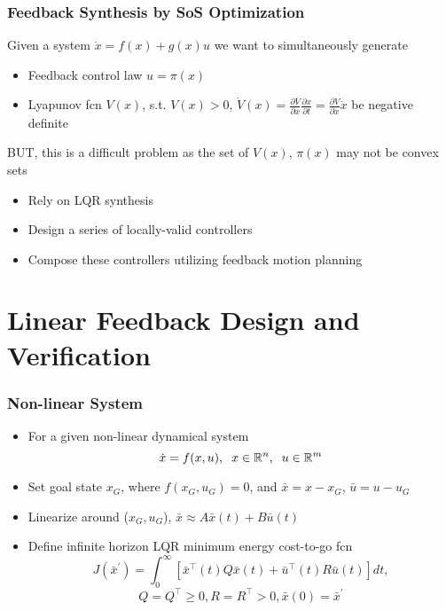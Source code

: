 \documentclass{beamer}
\begin{document}

\begin{frame}
\frametitle{Feedback Synthesis by SoS Optimization}
Given a system $\dot{x} = f(x) + g(x)u$ we want to simultaneously generate
\begin{itemize}
\item Feedback control law $u=\pi (x)$
\item Lyapunov fcn $V(x)$, s.t.  $V(x)>0$, $\dot{V}(x)=\frac{\partial V}{\partial x}\frac{\partial x}{\partial t}=\frac{\partial V}{\partial x}\dot{x}$ be negative definite \vspace{.2cm}
\end{itemize}
BUT, this is a difficult problem as the set of $V(x)$, $\pi(x)$ may not be convex sets
\begin{itemize}
\item Rely on LQR synthesis \vspace{.2cm}
\item Design a series of locally-valid controllers \vspace{.2cm}
\item Compose these controllers utilizing feedback motion planning
\end{itemize}
\end{frame}

\section{Linear Feedback Design and Verification}

\begin{frame}
\frametitle{Non-linear System}
\begin{itemize}
\item For a given non-linear dynamical system
\begin{equation*}
\dot{x} = f(x,u), \hspace{.2cm} x\in \mathbb{R}^n, \hspace{.2cm} u\in \mathbb{R}^m 
\end{equation*} 
\item Set goal state $x_G$, where $f(x_G,u_G)=0$, and $\bar{x}=x-x_G$, $\bar{u}=u-u_G$
\item Linearize around ($x_G, u_G$), $\bar{x}\approx A\bar{x}(t)+B\bar{u}(t)$ 
\item Define infinite horizon LQR minimum energy cost-to-go fcn
\begin{equation*}
J(\bar{x}^{\prime})= \int_0^{\infty} [ \bar{x}^{\intercal}(t)Q\bar{x}(t)+\bar{u}^{\intercal}(t)R\bar{u}(t)]dt,
\end{equation*}
\begin{equation*}
Q=Q^{\intercal}\geq 0, R=R^{\intercal}> 0, \bar{x}(0)=\bar{x}^{\prime}
\end{equation*}
\end{itemize}
\end{frame}
\end{document}
